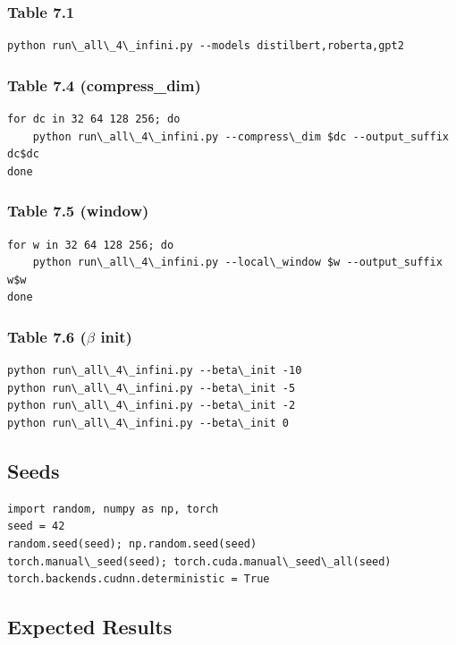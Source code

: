 \subsubsection{Table 7.1}
\begin{lstlisting}
python run\_all\_4\_infini.py --models distilbert,roberta,gpt2
\end{lstlisting}

\subsubsection{Table 7.4 (compress\_dim)}
\begin{lstlisting}
for dc in 32 64 128 256; do
    python run\_all\_4\_infini.py --compress\_dim $dc --output_suffix dc$dc
done
\end{lstlisting}

\subsubsection{Table 7.5 (window)}
\begin{lstlisting}
for w in 32 64 128 256; do
    python run\_all\_4\_infini.py --local\_window $w --output_suffix w$w
done
\end{lstlisting}

\subsubsection{Table 7.6 ($\beta$ init)}
\begin{lstlisting}
python run\_all\_4\_infini.py --beta\_init -10
python run\_all\_4\_infini.py --beta\_init -5
python run\_all\_4\_infini.py --beta\_init -2
python run\_all\_4\_infini.py --beta\_init 0
\end{lstlisting}

\subsection{Seeds}

\begin{lstlisting}
import random, numpy as np, torch
seed = 42
random.seed(seed); np.random.seed(seed)
torch.manual\_seed(seed); torch.cuda.manual\_seed\_all(seed)
torch.backends.cudnn.deterministic = True
\end{lstlisting}

\subsection{Expected Results}

